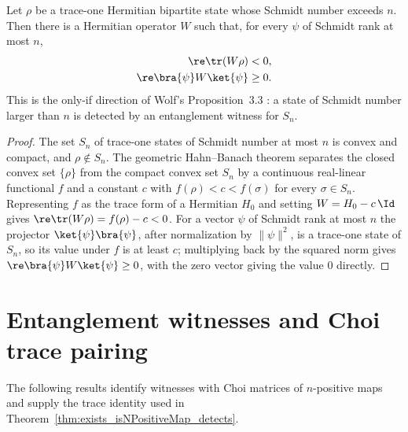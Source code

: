\begin{theorem}
    \label{thm:exists_entanglement_witness}
    \leanok
    Let $\rho$ be a trace-one Hermitian bipartite state whose Schmidt number exceeds $n$.
    Then there is a Hermitian operator $W$ such that, for every $\psi$ of Schmidt rank
    at most $n$,
    \begin{align}
        \re\tr(W\rho)            & <0,
        \notag                            \\
        \re\bra{\psi}W\ket{\psi} & \ge 0.
        \notag
    \end{align}
    This is the only-if direction of Wolf's Proposition~3.3
    \cite[Chapter~3, Proposition~3.3]{Wolf2012Quantum}: a state of Schmidt number larger
    than $n$ is detected by an entanglement witness for $S_n$.
\end{theorem}

\begin{proof}
    \leanok
    The set $S_n$ of trace-one states of Schmidt number at most $n$ is convex and
    compact, and $\rho\notin S_n$. The geometric Hahn--Banach theorem separates the
    closed convex set $\{\rho\}$ from the compact convex set $S_n$ by a continuous
    real-linear functional $f$ and a constant $c$ with $f(\rho)<c<f(\sigma)$ for every
    $\sigma\in S_n$. Representing $f$ as the trace form of a Hermitian $H_0$ and setting
    $W=H_0-c\,\Id$ gives $\re\tr(W\rho)=f(\rho)-c<0$. For a vector $\psi$
    of Schmidt rank at most $n$ the projector $\ket{\psi}\bra{\psi}$, after
    normalization by $\lVert\psi\rVert^2$, is a trace-one state of $S_n$, so its value
    under $f$ is at least $c$; multiplying back by the squared norm gives
    $\re\bra{\psi}W\ket{\psi}\ge 0$, with the zero vector giving the value
    $0$ directly.
\end{proof}

\section{Entanglement witnesses and Choi trace pairing}
\label{sec:app_positive_not_cp_witness_choi}

The following results identify witnesses with Choi matrices of $n$-positive
maps and supply the trace identity used in
Theorem~\ref{thm:exists_isNPositiveMap_detects}.

